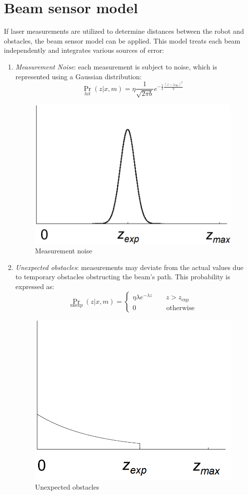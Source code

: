 \section{Beam sensor model}

If laser measurements are utilized to determine distances between the robot and obstacles, the beam sensor model can be applied. 
This model treats each beam independently and integrates various sources of error:
\begin{enumerate}
    \item \textit{Measurement Noise}: each measurement is subject to noise, which is represented using a Gaussian distribution:
        \[\Pr_{hit}(z|x,m)=\eta \dfrac{1}{\sqrt{2\pi b}}e^{-\frac{1}{2}\frac{{\left(z-z_{\text{exp}}\right)}^2}{b}}\]
        \begin{figure}[H]
            \centering
            \includegraphics[width=0.4\linewidth]{images/mn.png}
            \caption{Measurement noise}
        \end{figure}
    \item \textit{Unexpected obstacles}: measurements may deviate from the actual values due to temporary obstacles obstructing the beam's path. 
        This probability is expressed as:
        \[\Pr_{\text{unexp}}(z|x,m)=\begin{cases}
            \eta\lambda e^{-\lambda z} \qquad z>z_{\text{exp}} \\
            0 \qquad\qquad\:\: \text{otherwise}
        \end{cases}\]
        \begin{figure}[H]
            \centering
            \includegraphics[width=0.4\linewidth]{images/uo.png}
            \caption{Unexpected obstacles}

\end{figure}
\end{enumerate}
